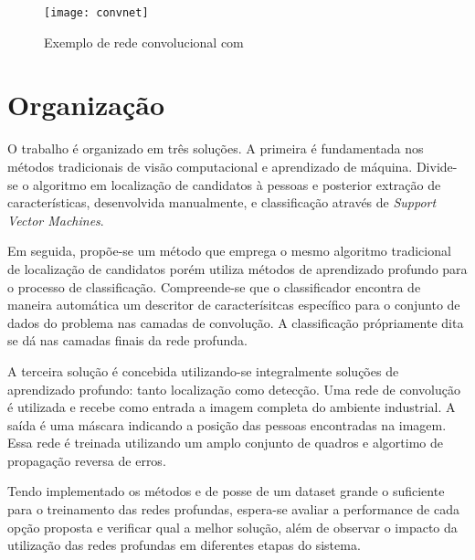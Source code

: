 \begin{figure}[h]
\caption{Exemplo de rede convolucional com }
\centering
\texttt{[image: convnet]}
\label{fig:convnet}
\end{figure}

\section{Organização}
O trabalho é organizado em três soluções. A primeira é fundamentada nos métodos tradicionais de visão computacional e aprendizado de máquina. Divide-se o algoritmo em localização de candidatos à pessoas e posterior extração de características, desenvolvida manualmente, e classificação através de \textit{Support Vector Machines}.

Em seguida, propõe-se um método que emprega o mesmo algoritmo tradicional de localização de candidatos porém utiliza métodos de aprendizado profundo para o processo de classificação. Compreende-se que o classificador encontra de maneira automática um descritor de caracterísitcas específico para o conjunto de dados do problema nas camadas de convolução. A classificação própriamente dita se dá nas camadas finais da rede profunda.

A terceira solução é concebida utilizando-se integralmente soluções de aprendizado profundo: tanto localização como detecção. Uma rede de convolução é utilizada e recebe como entrada a imagem completa do ambiente industrial. A saída é uma máscara indicando a posição das pessoas encontradas na imagem. Essa rede é treinada utilizando um amplo conjunto de quadros e algortimo de propagação reversa de erros.

Tendo implementado os métodos e de posse de um dataset grande o suficiente para o treinamento das redes profundas, espera-se avaliar a performance de cada opção proposta e verificar qual a melhor solução, além de observar o impacto da utilização das redes profundas em diferentes etapas do sistema.




